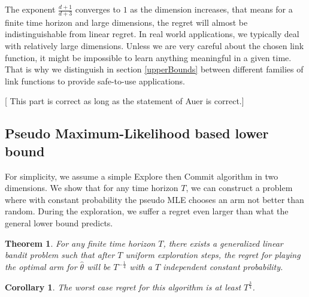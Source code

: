 \documentclass[twoside]{article} \usepackage{aistats2017}
\newtheorem{theorem}{Theorem}
\newtheorem{corollary}{Corollary}[theorem]
\newcommand{\shuai}[1]{{\color{blue!50!black} [\text{Shuai:} #1]}}
\begin{document}
The exponent $\frac{d+1}{d+3}$ converges to $1$ as the dimension increases, that means for a finite time horizon and large dimensions, the regret will almost be indistinguishable from linear regret. 
In real world applications, we typically deal with relatively large dimensions. 
Unless we are very careful about the chosen link function, it might be impossible to learn anything meaningful in a given time.
That is why we distinguish in section \ref{upperBounds} between different families of link functions to provide safe-to-use applications.

\shuai{This part is correct as long as the statement of Auer is correct.}

\subsection{Pseudo Maximum-Likelihood based lower bound}
For simplicity, we assume a simple Explore then Commit algorithm in two dimensions. 
We show that for any time horizon $T$, we can construct a problem where with constant probability the pseudo MLE chooses an arm not better than random.
During the exploration, we suffer a regret even larger than what the general lower bound predicts.
\begin{theorem}
For any finite time horizon $T$, there exists a generalized linear bandit problem such that after $T$ uniform exploration steps, the regret for playing the optimal arm for $\hat{\theta}$ will be $T^{-\frac{1}{4}}$ with a $T$ independent constant probability.
\end{theorem}
\begin{corollary}
The worst case regret for this algorithm is at least $T^{\frac{3}{4}}$.
\end{corollary}
\end{document}
